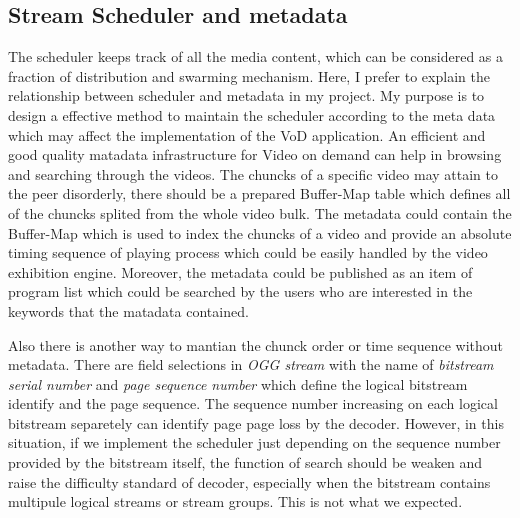\subsection{Stream Scheduler and metadata}
{
The scheduler keeps track of all the media content, which can be considered as a fraction of distribution and swarming mechanism.
Here, I prefer to explain the relationship between scheduler and metadata in my project.
My purpose is to design a effective method to maintain the scheduler according to the meta data which may affect the implementation of the VoD application.
An efficient and good quality matadata infrastructure for Video on demand can help in browsing and searching through the videos.
The chuncks of a specific video may attain to the peer disorderly, there should be a prepared Buffer-Map table which defines all of the chuncks splited from the whole video bulk.
The metadata could contain the Buffer-Map which is used to index the chuncks of a video and provide an absolute timing sequence of playing process which could be easily handled by the video exhibition engine.
Moreover, the metadata could be published as an item of program list which could be searched by the users who are interested in the keywords that the matadata contained.

Also there is another way to mantian the chunck order or time sequence without metadata.
There are field selections in \emph{OGG stream} with the name of \emph{bitstream serial number} and \emph{page sequence number} which define the logical bitstream identify and the page sequence. 
The sequence number increasing on each logical bitstream separetely can identify page page loss by the decoder.
However, in this situation, if we implement the scheduler just depending on the sequence number provided by the bitstream itself, the function of search should be weaken and raise the difficulty standard of decoder, especially when the bitstream contains multipule logical streams or stream groups.
This is not what we expected.
}

